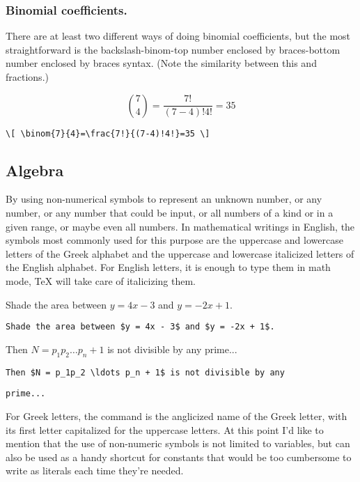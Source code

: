 \subsubsection{Binomial coefficients.} There are at least two different ways of doing binomial coefficients, but the most straightforward is the backslash-binom-top number enclosed by braces-bottom number enclosed by braces syntax. (Note the similarity between this and fractions.)

\[ \binom{7}{4}=\frac{7!}{(7-4)!4!}=35 \]

\verb'\[ \binom{7}{4}=\frac{7!}{(7-4)!4!}=35 \]'

\subsection{Algebra}

By using non-numerical symbols to represent an unknown number, or any number, or any number that could be input, or all numbers of a kind or in a given range, or maybe even all numbers. In mathematical writings in English, the symbols most commonly used for this purpose are the uppercase and lowercase letters of the Greek alphabet and the uppercase and lowercase italicized letters of the English alphabet. For English letters, it is enough to type them in math mode, \TeX{} will take care of italicizing them.

\medskip

Shade the area between $y = 4x - 3$ and $y = -2x + 1$.

\smallskip

\verb'Shade the area between $y = 4x - 3$ and $y = -2x + 1$.'

\medskip

Then $N = p_1p_2 \ldots p_n + 1$ is not divisible by any prime...

\smallskip

\verb'Then $N = p_1p_2 \ldots p_n + 1$ is not divisible by any'

\verb'prime...'

\bigskip

For Greek letters, the command is the anglicized name of the Greek letter, with its first letter capitalized for the uppercase letters. At this point I'd like to mention that the use of non-numeric symbols is not limited to variables, but can also be used as a handy shortcut for constants that would be too cumbersome to write as literals each time they're needed.

\medskip

